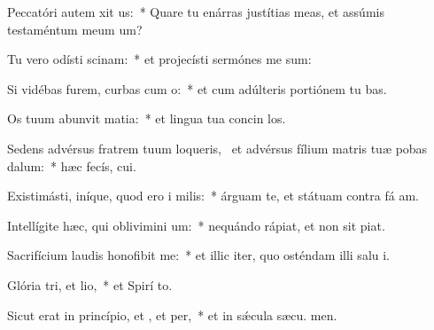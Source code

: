 \item Peccatóri autem xit us:~* Quare tu enárras justítias meas, et assúmis testaméntum meum   um?
\item Tu vero odísti scinam:~* et projecísti sermónes me sum:
\item Si vidébas furem, curbas cum o:~* et cum adúlteris portiónem tu bas.
\item Os tuum abunvit matia:~* et lingua tua concin los.
\item Sedens advérsus fratrem tuum loqueris,~\pscross{} et advérsus fílium matris tuæ pobas dalum:~* hæc fecís,  cui.
\item Existimásti, iníque, quod ero i milis:~* árguam te, et státuam contra fá am.
\item Intellígite hæc, qui oblivimini um:~* nequándo rápiat, et non sit  piat.
\item Sacrifícium laudis honofibit me:~* et illic iter, quo osténdam illi salu i.
\item Glória tri, et lio,~* et Spirí to.
\item Sicut erat in princípio, et , et per,~* et in sǽcula sæcu. men.

